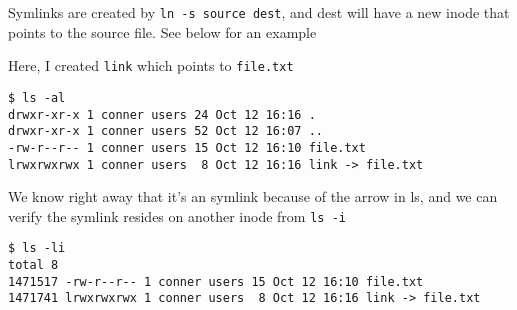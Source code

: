 Symlinks are created by \texttt{ln -s source dest}, and dest will have a new
inode that points to the source file. See below for an example

Here, I created \texttt{link} which points to \texttt{file.txt}
\begin{verbatim}
$ ls -al
drwxr-xr-x 1 conner users 24 Oct 12 16:16 .
drwxr-xr-x 1 conner users 52 Oct 12 16:07 ..
-rw-r--r-- 1 conner users 15 Oct 12 16:10 file.txt
lrwxrwxrwx 1 conner users  8 Oct 12 16:16 link -> file.txt
\end{verbatim}

We know right away that it's an symlink because of the arrow in ls, and we can
verify the symlink resides on another inode from \texttt{ls -i}

\begin{verbatim}
$ ls -li
total 8
1471517 -rw-r--r-- 1 conner users 15 Oct 12 16:10 file.txt
1471741 lrwxrwxrwx 1 conner users  8 Oct 12 16:16 link -> file.txt
\end{verbatim}

